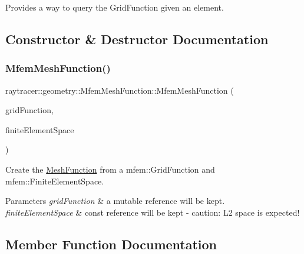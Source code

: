 Provides a way to query the Grid\+Function given an element. 

\subsection{Constructor \& Destructor Documentation}
\mbox{\label{classraytracer_1_1geometry_1_1MfemMeshFunction_a38898aa9932de5f6d8ceecdf27d26761}} 
\subsubsection{\texorpdfstring{Mfem\+Mesh\+Function()}{MfemMeshFunction()}}
{\footnotesize\ttfamily raytracer\+::geometry\+::\+Mfem\+Mesh\+Function\+::\+Mfem\+Mesh\+Function (\begin{DoxyParamCaption}\item[{mfem\+::\+Grid\+Function \&}]{grid\+Function,  }\item[{const mfem\+::\+Finite\+Element\+Space \&}]{finite\+Element\+Space }\end{DoxyParamCaption})\hspace{0.3cm}{\ttfamily [explicit]}}



Create the \hyperlink{classraytracer_1_1geometry_1_1MeshFunction}{Mesh\+Function} from a mfem\+::\+Grid\+Function and mfem\+::\+Finite\+Element\+Space. 


\begin{DoxyParams}{Parameters}
{\em grid\+Function} & a mutable reference will be kept. \\
\hline
{\em finite\+Element\+Space} & const reference will be kept -\/ caution\+: L2 space is expected! \\
\hline
\end{DoxyParams}


\subsection{Member Function Documentation}
\mbox{\label{classraytracer_1_1geometry_1_1MfemMeshFunction_a886efe65ad4667b09e00381c57bb7be8}} 
